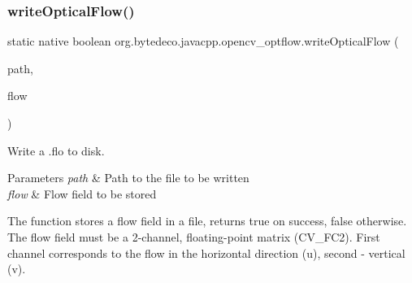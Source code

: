 \subsubsection{\texorpdfstring{write\+Optical\+Flow()}{writeOpticalFlow()}}
{\footnotesize\ttfamily static native boolean org.\+bytedeco.\+javacpp.\+opencv\+\_\+optflow.\+write\+Optical\+Flow (\begin{DoxyParamCaption}\item[{@Str Byte\+Pointer}]{path,  }\item[{@By\+Val Mat}]{flow }\end{DoxyParamCaption})\hspace{0.3cm}{\ttfamily [static]}}



Write a .flo to disk. 


\begin{DoxyParams}{Parameters}
{\em path} & Path to the file to be written \\
\hline
{\em flow} & Flow field to be stored \\
\hline
\end{DoxyParams}
The function stores a flow field in a file, returns true on success, false otherwise. The flow field must be a 2-\/channel, floating-\/point matrix (C\+V\+\_\+F\+C2). First channel corresponds to the flow in the horizontal direction (u), second -\/ vertical (v). 